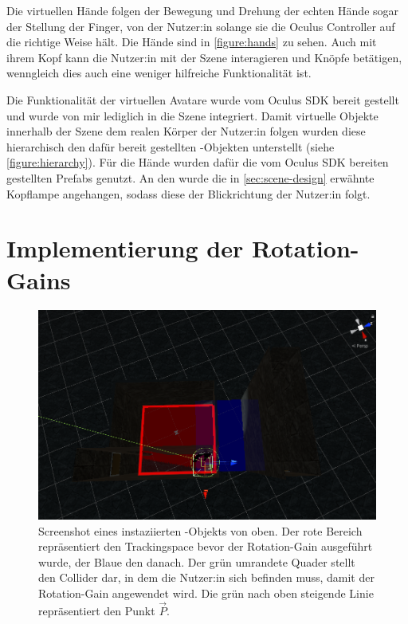 Die virtuellen Hände folgen der Bewegung und Drehung der echten Hände sogar der Stellung der Finger, von der Nutzer:in solange sie die Oculus Controller auf die richtige Weise hält. Die Hände sind in \autoref{figure:hands} zu sehen.
Auch mit ihrem Kopf kann die Nutzer:in mit der Szene interagieren und Knöpfe betätigen, wenngleich dies auch eine weniger hilfreiche Funktionalität ist.

Die Funktionalität der virtuellen Avatare wurde vom Oculus SDK bereit gestellt und wurde von mir lediglich in die Szene integriert. %
Damit virtuelle Objekte innerhalb der Szene dem realen Körper der Nutzer:in folgen wurden diese hierarchisch den dafür bereit gestellten -Objekten unterstellt (siehe \autoref{figure:hierarchy}). Für die Hände wurden dafür die vom Oculus SDK bereiten gestellten Prefabs genutzt. %
An den  wurde die in \autoref{sec:scene-design} erwähnte Kopflampe angehangen, sodass diese der Blickrichtung der Nutzer:in folgt.

\section{Implementierung der Rotation-Gains}

\begin{figure}[!h]
    \centering
    \includegraphics[width=1\textwidth]{images/rotationredirector.png}
    \caption{Screenshot eines instaziierten -Objekts von oben. Der rote Bereich repräsentiert den Trackingspace bevor der Rotation-Gain ausgeführt wurde, der Blaue den danach. Der grün umrandete Quader stellt den Collider dar, in dem die Nutzer:in sich befinden muss, damit der Rotation-Gain angewendet wird. Die grün nach oben steigende Linie repräsentiert den Punkt $\vec{P}$.}\label{figure:rotredirector}
\end{figure}

